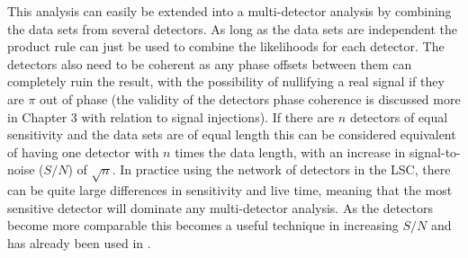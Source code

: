 This analysis can easily be extended into a multi-detector analysis by combining the data sets from
several detectors.  As long as the data sets are independent the product rule can just be used to
combine the likelihoods for each detector. The detectors also need to be coherent as any phase
offsets between them can completely ruin the result, with the possibility of nullifying a real
signal if they are $\pi$ out of phase (the validity of the detectors phase coherence is discussed
more in Chapter 3 with relation to signal injections). If there are $n$ detectors of equal
sensitivity and the data sets are of equal length this can be considered equivalent of having one
detector with $n$ times the data length, with an increase in signal-to-noise ($S/N$) of $\sqrt{n}$.
In practice using the network of detectors in the LSC, there can be quite large differences in
sensitivity and live time, meaning that the most sensitive detector will dominate any multi-detector
analysis. As the detectors become more comparable this becomes a useful technique in increasing
$S/N$ and has already been used in \cite{Abbott:2005}.

